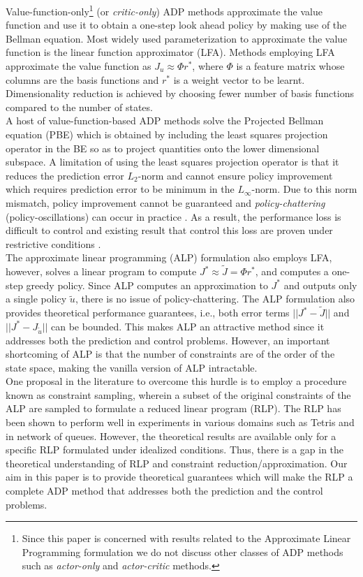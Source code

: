 Value-function-only\footnote{Since this paper is concerned with results related to the Approximate Linear Programming formulation we do not discuss other classes of ADP methods such as \emph{actor-only} and \emph{actor-critic} methods.} (or \emph{critic-only}) ADP methods approximate the value function and use it to obtain a one-step look ahead policy by making use of the Bellman equation. Most widely used parameterization to approximate the value function is the linear function approximator (LFA). Methods employing LFA approximate the value function as $J_u\approx\Phi r^*$, where $\Phi$ is a feature matrix whose columns are the basis functions and $r^*$ is a weight vector to be learnt. Dimensionality reduction is achieved by choosing fewer number of basis functions compared to the number of states.\\
A host of value-function-based ADP methods solve the Projected Bellman equation (PBE) which is obtained by including the least squares projection operator in the BE so as to project quantities onto the lower dimensional subspace. A limitation of using the least squares projection operator is that it reduces the prediction error $L_2$-norm and cannot ensure policy improvement which requires prediction error to be minimum in the $L_\infty$-norm. Due to this norm mismatch, policy improvement cannot be guaranteed and \emph{policy-chattering} (policy-oscillations) can occur in practice \cite{dpchapter}. 
As a result, the performance loss is difficult to control and existing result that control this loss are proven under restrictive conditions \cite[e.g.,][]{anszemu:mlj07,FaMuSz10}.\\
The approximate linear programming (ALP) \cite{ALP,CS,SALP,ALP-Bor,gkp,fs,npalp} formulation also employs LFA, however, solves a linear program to compute $J^*\approx\tilde{J}=\Phi r^*$, and computes a one-step greedy policy. Since ALP computes an approximation to $J^*$ and outputs only a single policy $\tilde{u}$, there is no issue of policy-chattering. The ALP formulation also provides theoretical performance guarantees, i.e., both error terms $||J^*-\tilde{J}||$ and $||J^*-J_{\tilde{u}}||$ can be bounded. This makes ALP an attractive method since it addresses both the prediction and control problems. However, an important shortcoming of ALP is that the number of constraints are of the order of the state space, making the vanilla version of ALP intractable.\\
One proposal in the literature to overcome this hurdle is to employ a procedure known as constraint sampling, wherein a subset of the original constraints of the ALP are sampled to formulate a reduced linear program (RLP). The RLP has been shown to perform well in experiments \cite{ALP,CS,CST} in various domains such as Tetris and in network of queues. However, the theoretical results \cite{CS} are available only for a specific RLP formulated under idealized conditions. Thus, there is a gap in the theoretical understanding of RLP and constraint reduction/approximation. Our aim in this paper is to provide theoretical guarantees which will make the RLP a complete ADP method that addresses both the prediction and the control problems.\\
